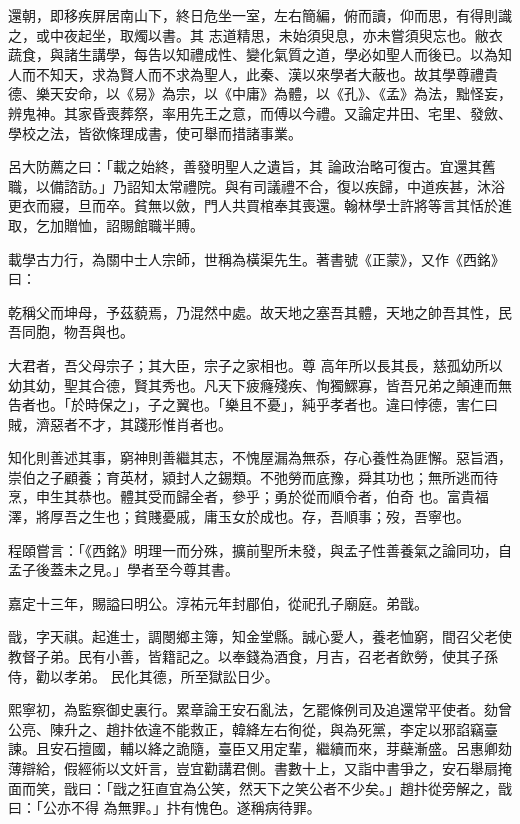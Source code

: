 \begin{pinyinscope}
 還朝，即移疾屏居南山下，終日危坐一室，左右簡編，俯而讀，仰而思，有得則識之，或中夜起坐，取燭以書。其
 志道精思，未始須臾息，亦未嘗須臾忘也。敝衣蔬食，與諸生講學，每告以知禮成性、變化氣質之道，學必如聖人而後已。以為知人而不知天，求為賢人而不求為聖人，此秦、漢以來學者大蔽也。故其學尊禮貴德、樂天安命，以《易》為宗，以《中庸》為體，以《孔》、《孟》為法，黜怪妄，辨鬼神。其家昏喪葬祭，率用先王之意，而傅以今禮。又論定井田、宅里、發斂、學校之法，皆欲條理成書，使可舉而措諸事業。



 呂大防薦之曰：「載之始終，善發明聖人之遺旨，其
 論政治略可復古。宜還其舊職，以備諮訪。」乃詔知太常禮院。與有司議禮不合，復以疾歸，中道疾甚，沐浴更衣而寢，旦而卒。貧無以斂，門人共買棺奉其喪還。翰林學士許將等言其恬於進取，乞加贈恤，詔賜館職半賻。



 載學古力行，為關中士人宗師，世稱為橫渠先生。著書號《正蒙》，又作《西銘》曰：



 乾稱父而坤母，予茲藐焉，乃混然中處。故天地之塞吾其體，天地之帥吾其性，民吾同胞，物吾與也。



 大君者，吾父母宗子；其大臣，宗子之家相也。尊
 高年所以長其長，慈孤幼所以幼其幼，聖其合德，賢其秀也。凡天下疲癃殘疾、恂獨鰥寡，皆吾兄弟之顛連而無告者也。「於時保之」，子之翼也。「樂且不憂」，純乎孝者也。違曰悖德，害仁曰賊，濟惡者不才，其踐形惟肖者也。



 知化則善述其事，窮神則善繼其志，不愧屋漏為無忝，存心養性為匪懈。惡旨酒，崇伯之子顧養；育英材，潁封人之錫類。不弛勞而底豫，舜其功也；無所逃而待烹，申生其恭也。體其受而歸全者，參乎；勇於從而順令者，伯奇
 也。富貴福澤，將厚吾之生也；貧賤憂戚，庸玉女於成也。存，吾順事；歿，吾寧也。



 程頤嘗言：「《西銘》明理一而分殊，擴前聖所未發，與孟子性善養氣之論同功，自孟子後蓋未之見。」學者至今尊其書。



 嘉定十三年，賜謚曰明公。淳祐元年封郿伯，從祀孔子廟庭。弟戩。



 戩，字天祺。起進士，調閿鄉主簿，知金堂縣。誠心愛人，養老恤窮，間召父老使教督子弟。民有小善，皆籍記之。以奉錢為酒食，月吉，召老者飲勞，使其子孫侍，勸以孝弟。
 民化其德，所至獄訟日少。



 熙寧初，為監察御史裏行。累章論王安石亂法，乞罷條例司及追還常平使者。劾曾公亮、陳升之、趙抃依違不能救正，韓絳左右徇從，與為死黨，李定以邪諂竊臺諫。且安石擅國，輔以絳之詭隨，臺臣又用定輩，繼續而來，芽蘗漸盛。呂惠卿劾薄辯給，假經術以文奸言，豈宜勸講君側。書數十上，又詣中書爭之，安石舉扇掩面而笑，戩曰：「戩之狂直宜為公笑，然天下之笑公者不少矣。」趙抃從旁解之，戩曰：「公亦不得
 為無罪。」抃有愧色。遂稱病待罪。




\end{pinyinscope}
